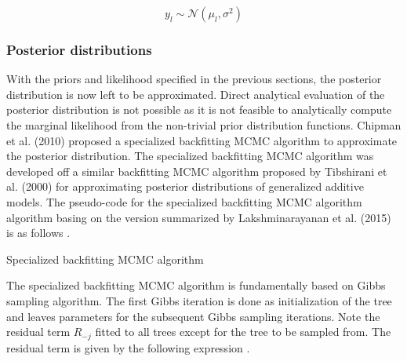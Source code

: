 \documentclass{usiinftr}
\begin{document}
\begin{equation}
y_l \sim \mathcal{N}(\mu_l, \sigma^2)
\end{equation}



\subsubsection{Posterior distributions}
With the priors and likelihood specified in the previous sections, the posterior distribution is now left to be approximated. Direct analytical evaluation of the posterior distribution is not possible as it is not feasible to analytically compute the marginal likelihood from the non-trivial prior distribution functions. Chipman et al. (2010) \cite{7} proposed a specialized backfitting MCMC algorithm to approximate the posterior distribution. The specialized backfitting MCMC algorithm was developed off a similar backfitting MCMC algorithm proposed by Tibshirani et al. (2000) \cite{31} for approximating posterior distributions of generalized additive models. The pseudo-code for the specialized backfitting MCMC algorithm algorithm basing on the version summarized by Lakshminarayanan et al. (2015) is as follows \cite{32}.

\begin{algorithm}[h]
  \caption{Specialized backfitting MCMC algorithm} \label{algSpc}
  \begin{algorithmic}[1]
    \Statex
    \EndFor
    	\EndFor
    \EndFor
    \EndFunction
  \end{algorithmic}
\end{algorithm}

The specialized backfitting MCMC algorithm is fundamentally based on Gibbs sampling algorithm. The first Gibbs iteration is done as initialization of the tree and leaves parameters for the subsequent Gibbs sampling iterations. Note the residual term $R_{-j}$ fitted to all trees except for the tree to be sampled from. The residual term is given by the following expression \cite{7}.
\end{document}
